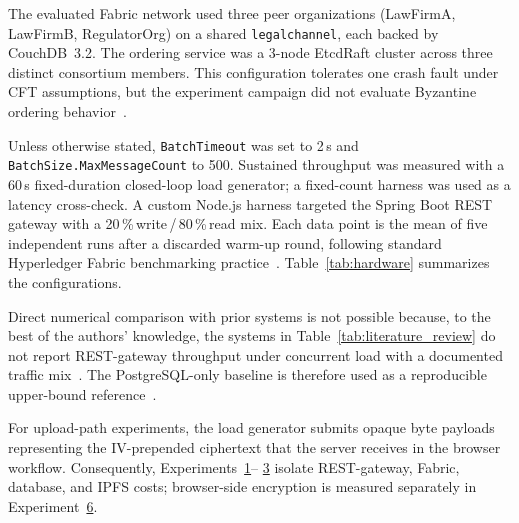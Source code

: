 \documentclass{ieeeaccess}
\begin{document}
The evaluated Fabric network used three peer organizations
(LawFirmA, LawFirmB, RegulatorOrg) on a shared \texttt{legalchannel},
each backed by CouchDB~3.2. The ordering service was a 3-node EtcdRaft
cluster across three distinct consortium members. This configuration
tolerates one crash fault under CFT assumptions, but the experiment
campaign did not evaluate Byzantine ordering behavior~\cite{hyperledgerFabricOrderingService_v24}.

Unless otherwise stated, \texttt{BatchTimeout} was set to 2\,s and
\texttt{BatchSize.MaxMessageCount} to 500. Sustained throughput was
measured with a 60\,s fixed-duration closed-loop load generator; a
fixed-count harness was used as a latency cross-check. A custom Node.js
harness targeted the Spring Boot REST gateway with a
20\,\%\,write\,/\,80\,\%\,read mix. Each data point is the mean of five
independent runs after a discarded warm-up round, following standard
Hyperledger Fabric benchmarking practice~\cite{caliper2021,woznica2022}.
Table~\ref{tab:hardware} summarizes the configurations.

Direct numerical comparison with prior systems is not possible because,
to the best of the authors' knowledge, the systems in
Table~\ref{tab:literature_review} do not report REST-gateway throughput
under concurrent load with a documented traffic mix~\cite{liu2024blockchain,twoLevelBlockchain,
onyeashie2025fabricEvidence,verma2021nyaya,hanafi2021ipfschain}. The
PostgreSQL-only baseline is therefore used as a reproducible upper-bound
reference~\cite{thakur2024}.

For upload-path experiments, the load generator submits opaque byte payloads
representing the IV-prepended ciphertext that the server receives in the
browser workflow. Consequently, Experiments~\hyperref[sec:exp_scalability]{1}--
\hyperref[sec:exp_filesize]{3} isolate REST-gateway, Fabric, database, and
IPFS costs; browser-side encryption is measured separately in
Experiment~\hyperref[sec:exp_crypto]{6}.
\end{document}
